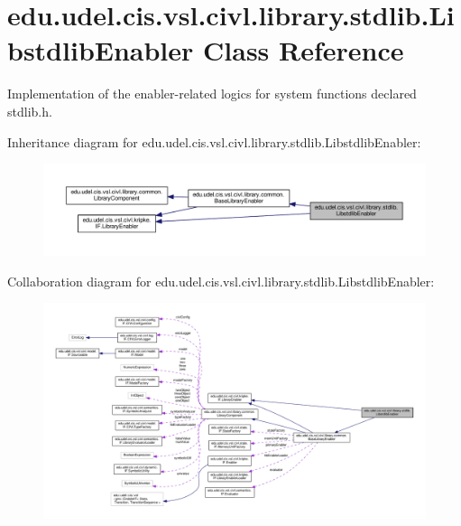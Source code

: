\hypertarget{classedu_1_1udel_1_1cis_1_1vsl_1_1civl_1_1library_1_1stdlib_1_1LibstdlibEnabler}{}\section{edu.\+udel.\+cis.\+vsl.\+civl.\+library.\+stdlib.\+Libstdlib\+Enabler Class Reference}
\label{classedu_1_1udel_1_1cis_1_1vsl_1_1civl_1_1library_1_1stdlib_1_1LibstdlibEnabler}


Implementation of the enabler-\/related logics for system functions declared stdlib.\+h.  




Inheritance diagram for edu.\+udel.\+cis.\+vsl.\+civl.\+library.\+stdlib.\+Libstdlib\+Enabler\+:
\nopagebreak
\begin{figure}[H]
\begin{center}
\leavevmode
\includegraphics[width=350pt]{classedu_1_1udel_1_1cis_1_1vsl_1_1civl_1_1library_1_1stdlib_1_1LibstdlibEnabler__inherit__graph}
\end{center}
\end{figure}


Collaboration diagram for edu.\+udel.\+cis.\+vsl.\+civl.\+library.\+stdlib.\+Libstdlib\+Enabler\+:
\nopagebreak
\begin{figure}[H]
\begin{center}
\leavevmode
\includegraphics[width=350pt]{classedu_1_1udel_1_1cis_1_1vsl_1_1civl_1_1library_1_1stdlib_1_1LibstdlibEnabler__coll__graph}
\end{center}
\end{figure}
